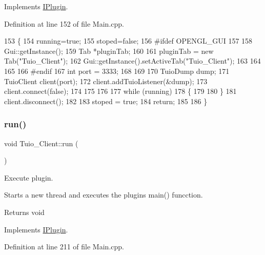 Implements \hyperlink{class_i_plugin_ab5fdb3b0f7afdcee04324dca01766749}{I\+Plugin}.



Definition at line 152 of file Main.\+cpp.


\begin{DoxyCode}
153 \{
154     running=\textcolor{keyword}{true};
155     stoped=\textcolor{keyword}{false};
156 \textcolor{preprocessor}{#ifdef OPENGL\_GUI
}
157 
158     Gui::getInstance();
159     Tab *pluginTab;
160 
161     pluginTab = \textcolor{keyword}{new} Tab(\textcolor{stringliteral}{"Tuio\_Client"});
162     Gui::getInstance().setActiveTab(\textcolor{stringliteral}{"Tuio\_Client"});
163 
164 
165 
166 \textcolor{preprocessor}{#endif
}
167 \textcolor{keywordtype}{int} port = 3333;
168     
169 
170     TuioDump dump;
171     TuioClient client(port);
172     client.addTuioListener(&dump);
173     client.connect(\textcolor{keyword}{false});
174     
175 
176 
177     \textcolor{keywordflow}{while} (running)
178     \{
179 
180     \}
181     client.disconnect();
182 
183     stoped = \textcolor{keyword}{true};
184     \textcolor{keywordflow}{return};
185 
186 \}
\end{DoxyCode}
\mbox{\label{class_tuio___client_ae326548bc87892e62dbe5f0a5a8b27cc}} 
\subsubsection{\texorpdfstring{run()}{run()}}
{\footnotesize\ttfamily void Tuio\+\_\+\+Client\+::run (\begin{DoxyParamCaption}{ }\end{DoxyParamCaption})\hspace{0.3cm}{\ttfamily [virtual]}}



Execute plugin. 

Starts a new thread and executes the plugins main() funcction. \begin{DoxyReturn}{Returns}
void 
\end{DoxyReturn}


Implements \hyperlink{class_i_plugin_a46b4ace767e77f9db9c9585e99c09039}{I\+Plugin}.



Definition at line 211 of file Main.\+cpp.



